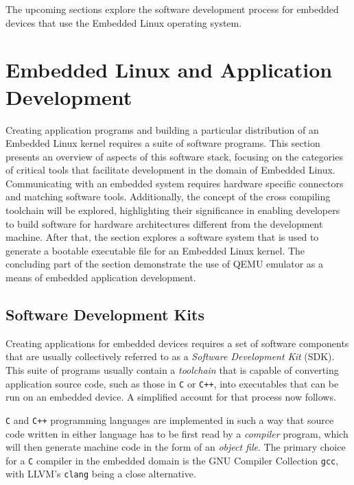 The upcoming sections explore the software development process for embedded devices that use the Embedded Linux operating system.

\section{Embedded Linux and Application Development}

Creating application programs and building a particular distribution of an Embedded Linux kernel requires a suite of software programs. This section presents an overview of aspects of this software stack, focusing on the categories of critical tools that facilitate development in the domain of Embedded Linux. Communicating with an embedded system requires hardware specific connectors and matching software tools. Additionally, the concept of the cross compiling toolchain will be explored, highlighting their significance in enabling developers to build software for hardware architectures different from the development machine. After that, the section explores a software system that is used to generate a bootable executable file for an Embedded Linux kernel. The concluding part of the section demonstrate the use of QEMU emulator as a means of embedded application development.

\subsection{Software Development Kits}

Creating applications for embedded devices requires a set of software components that are usually collectively referred to as a \textit{Software Development Kit} (SDK). This suite of programs usually contain a \textit{toolchain} that is capable of converting application source code, such as those in \texttt{C}  or \texttt{C++}, into executables that can be run on an embedded device. A simplified account for that process now follows.

\texttt{C} and \texttt{C++} programming languages are implemented in such a way that source code written in either language has to be first read by a \textit{compiler} program, which will then generate machine code in the form of an \textit{object file}. The primary choice for a \texttt{C} compiler in the embedded domain is the GNU Compiler Collection \texttt{gcc}, with LLVM's \texttt{clang} being a close alternative.

\begin{figure}[H]
	\centering
\end{figure}

